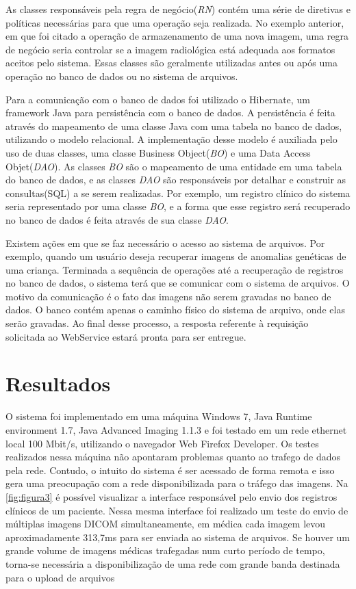 As classes responsáveis pela regra de negócio(\textit{RN}) contém uma série de diretivas e políticas necessárias para que uma operação seja realizada.
No exemplo anterior, em que foi citado a operação de armazenamento de uma nova imagem, uma regra de negócio seria controlar se a imagem radiológica está adequada aos formatos aceitos pelo sistema.
Essas classes são geralmente utilizadas antes ou após uma operação no banco de dados ou no sistema de arquivos.

Para a comunicação com o banco de dados foi utilizado o Hibernate, um framework Java para persistência com o banco de dados.
A persistência é feita através do mapeamento de uma classe Java com uma tabela no banco de dados, utilizando o modelo relacional.
A implementação desse modelo é auxiliada pelo uso de duas classes, uma classe Business Object(\textit{BO}) e uma Data Access Objet(\textit{DAO}).
As classes \textit{BO} são o mapeamento de uma entidade em uma tabela do banco de dados, e as classes \textit{DAO} são responsáveis por detalhar e construir as consultas(SQL) a se serem realizadas.
Por exemplo, um registro clínico do sistema seria representado por uma classe \textit{BO}, e a forma que esse registro será recuperado no banco de dados é feita através de sua classe \textit{DAO}.

Existem ações em que se faz necessário o acesso ao sistema de arquivos.
Por exemplo, quando um usuário deseja recuperar imagens de anomalias genéticas de uma criança.
Terminada a sequência de operações até a recuperação de registros no banco de dados, o sistema terá que se comunicar com o sistema de arquivos.
O motivo da comunicação é o fato das imagens não serem gravadas no banco de dados. O banco contém apenas o caminho físico do sistema de arquivo, onde elas serão gravadas.
Ao final desse processo, a resposta referente à requisição solicitada ao WebService estará pronta para ser entregue.

\section{\esp Resultados}

O sistema foi implementado em uma máquina Windows 7, Java Runtime environment 1.7, Java Advanced Imaging 1.1.3 e foi testado em um rede ethernet local 100 Mbit/s, utilizando o navegador Web Firefox Developer. Os testes realizados nessa máquina não apontaram problemas quanto ao trafego de dados pela rede. Contudo, o intuito do sistema é ser acessado de forma remota e isso gera uma preocupação com a rede disponibilizada para o tráfego das imagens. Na \ref{fig:figura3} é possível visualizar a interface responsável pelo envio dos registros clínicos de um paciente. Nessa mesma interface foi realizado um teste do envio de múltiplas imagens DICOM simultaneamente, em médica cada imagem levou aproximadamente 313,7ms para ser enviada ao sistema de arquivos. Se houver um grande volume de imagens médicas trafegadas num curto período de tempo, torna-se necessária a disponibilização de uma rede com grande banda destinada para o upload de arquivos

